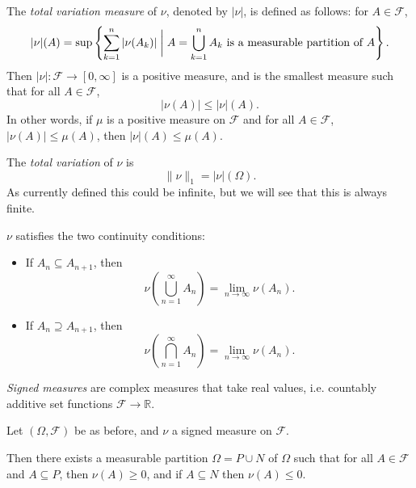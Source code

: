 \documentclass[12pt]{article}
\begin{document}
The \emph{total variation measure} of $\nu$, denoted by $|\nu|$, is defined as follows: for $A \in \mathcal{F}$,
\[
	|\nu|(A) = \sup \left\{  \sum_{k = 1}^n |\nu(A_k)| \biggm| A = \bigcup_{k = 1}^n A_k \text{ is a measurable partition of } A \right\}.
\]
Then $|\nu| : \mathcal{F} \to [0, \infty]$ is a positive measure, and is the smallest measure such that for all $A \in \mathcal{F}$,
\[
|\nu(A)| \leq |\nu|(A).
\]
In other words, if $\mu$ is a positive measure on $\mathcal{F}$ and for all $A \in \mathcal{F}$, $|\nu(A)| \leq \mu(A)$, then $|\nu|(A) \leq \mu(A)$.

The \emph{total variation} of $\nu$ is
\[
\|\nu\|_1 = |\nu|(\Omega).
\]
As currently defined this could be infinite, but we will see that this is always finite.

$\nu$ satisfies the two continuity conditions:
\begin{itemize}
	\item If $A_n \subseteq A_{n+1}$, then
		\[
		\nu\left( \bigcup_{n = 1}^\infty A_n \right) = \lim_{n \to \infty} \nu(A_n).
		\]
	\item If $A_n \supseteq A_{n+1}$, then
		\[
		\nu\left( \bigcap_{n = 1}^\infty A_n \right) = \lim_{n \to \infty} \nu(A_n).
		\]
\end{itemize}

\emph{Signed measures} are complex measures that take real values, i.e. countably additive set functions $\mathcal{F} \to \mathbb{R}$.

\begin{theorem}
	Let $(\Omega, \mathcal{F})$ be as before, and $\nu$ a signed measure on $\mathcal{F}$.

	Then there exists a measurable partition $\Omega = P \cup N$ of $\Omega$ such that for all $A \in \mathcal{F}$ and $A \subseteq P$, then $\nu(A) \geq 0$, and if $A \subseteq N$ then $\nu(A) \leq 0$.
\end{theorem}
\end{document}
